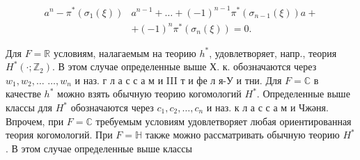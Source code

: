 \documentclass[10pt]{article}
\begin{document}
\[

\begin{aligned}

a^{n}-\pi^{*}\left(\sigma_{1}(\xi)\right) & a^{n-1}+\ldots+(-1)^{n-1} \pi^{*}\left(\sigma_{n-1}(\xi)\right) a+ \\

& +(-1)^{n} \pi^{*}\left(\sigma_{n}(\xi)\right)=0 .

\end{aligned}

\]



Для $F=\mathbb{R}$ условиям, налагаемым на теорию $h^{*}$, удовлетворяет, напр., теория $H^{*}\left(\cdot ; \mathbb{Z}_{2}\right)$. В этом случае определенные выше Х. к. обозначаются через $w_{1}, w_{2}, \ldots$ $\ldots, w_{n}$ и наз. г л а с с а м и III т и фе л я-У и тни. Для $F=\mathbb{C}$ в качестве $h^{*}$ можно взять обычную теорию когомологий $H^{*}$. Определенные выше классы для $H^{*}$ обозначаются через $c_{1}, c_{2}, \ldots, c_{n}$ и наз. к л а с с а м и Чжәня. Впрочем, при $F=\mathbb{C}$ требуемым условиям удовлетворяет любая ориентированная теория когомологий. При $F=\mathbb{H}$ также можно рассматривать обычную теорию $H^{*}$. В этом случае определенные выше классы
\end{document}
